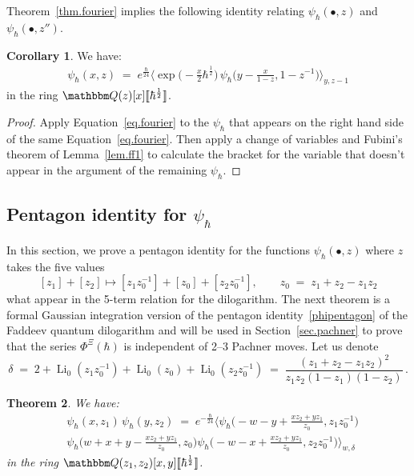 \documentclass[12pt,reqno]{amsart}
\newtheorem{theorem}{Theorem}[section]
\theoremstyle{definition}
\newtheorem{corollary}[theorem]{Corollary}
\def\BQ{\mathbbm Q}
\def\be{\begin{equation}}
\def\ee{\end{equation}}
\newcommand{\bea}{\begin{equation}\begin{aligned}}
\newcommand{\eea}{\end{aligned}\end{equation}}
\renewcommand{\=}{\;=\;}
\newcommand{\Li}{\operatorname{Li}}
\newcommand{\hroot}{\hbar^{\frac{1}{2}}}
\begin{document}
Theorem~\ref{thm.fourier} implies the following identity relating
$\psi_\hbar(\bullet,z)$ and $\psi_\hbar(\bullet,z'')$.

\begin{corollary}
\label{cor.fourier}
We have:
\bea
\label{eq.fourier2}
\psi_\hbar (x,z)
\=e^{\frac{\hbar}{24}}\Big\langle
\exp\Big(\!
-\frac{x}{2}\hbar^{\frac{1}{2}}\Big)\,
\psi_\hbar\Big(y-\frac{x}{1-z}, 1-z^{-1}\Big)
\Big\rangle_{y,z-1} 
\eea
in the ring $\BQ(z)[x]\llbracket\hroot\rrbracket$.
\end{corollary}
\begin{proof}
Apply Equation~\eqref{eq.fourier} to the $\psi_{\hbar}$
that appears on the right hand side of the same Equation~\eqref{eq.fourier}.
Then apply a change of variables and Fubini's
theorem of Lemma~\ref{lem.ff1} to calculate
the bracket for the variable that doesn't appear
in the argument of the remaining $\psi_{\hbar}$.
\end{proof}

\subsection{\texorpdfstring{Pentagon identity for $\psi_\hbar$}{Pentagon identity for psi}}
\label{sub.pentagon}

In this section, we prove a pentagon identity for the functions
$\psi_\hbar(\bullet,z)$ where $z$ takes the five values
\be
\label{5z}
[z_1]+[z_2]\mapsto
[z_1 z_0^{-1}] +[z_0] +[z_2 z_0^{-1}], 
\qquad z_0\=z_1+z_2-z_1 z_2
\ee
what appear in the 5-term relation for the dilogarithm.
The next theorem is a formal Gaussian integration version of the pentagon
identity~\eqref{phipentagon} of the Faddeev quantum dilogarithm and will be
used in Section~\ref{sec.pachner} to prove that the series $\Phi^\Xi(\hbar)$
is independent of 2--3 Pachner moves. Let us denote
\be
\label{eq.delta23}
\delta
\=2+\Li_{0}(z_1z_{0}^{-1})+\Li_{0}(z_{0})+\Li_{0}(z_2z_{0}^{-1})
\=
\frac{(z_1+z_2-z_1z_2)^2}{z_1z_2(1-z_1)(1-z_2)}\,.
\ee

\begin{theorem}
\label{thm.pentagon}
We have: 
\be
\label{eq.pentagon}
\begin{aligned}
&\psi_\hbar(x,z_1)\,\psi_\hbar(y,z_2)
\=e^{- \frac \hbar {24}}
\Big\langle
\psi_\hbar\Big(-w -y
+\frac{xz_2+yz_1}{z_0},
z_1z_0^{-1}\Big)\\
&
\psi_\hbar\Big(w+x+y
-\frac{xz_2+yz_1}{z_0},
z_0\Big)
\psi_\hbar\Big(-w-x
+\frac{xz_2+yz_1}{z_0},
z_2z_0^{-1}\Big)
\Big\rangle_{w,\delta}
\end{aligned}
\ee
in the ring $\BQ(z_1,z_2)[x,y]\llbracket\hroot\rrbracket$. 
\end{theorem}
\end{document}
